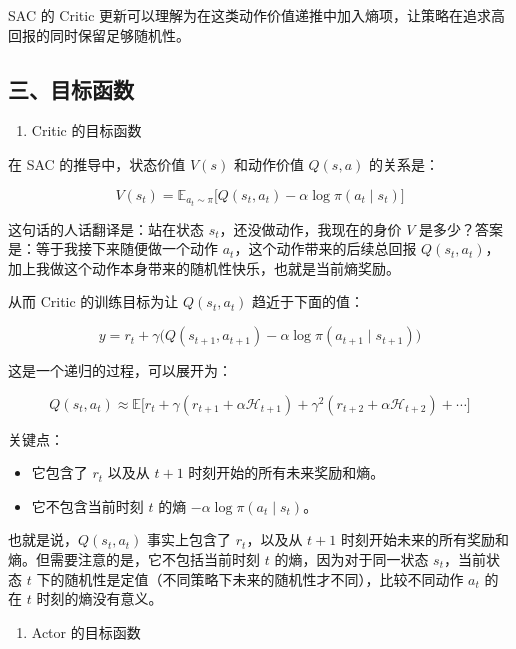 SAC 的 Critic 更新可以理解为在这类动作价值递推中加入熵项，让策略在追求高回报的同时保留足够随机性。

\hypertarget{ux4e09ux76eeux6807ux51fdux6570}{%
\subsection{三、目标函数}\label{ux4e09ux76eeux6807ux51fdux6570}}

\begin{enumerate}
\def\labelenumi{\arabic{enumi}.}
\tightlist
\item
  Critic 的目标函数
\end{enumerate}

在 SAC 的推导中，状态价值 \(V(s)\) 和动作价值 \(Q(s,a)\) 的关系是：

\[
V(s_t)
=
\mathbb{E}_{a_t\sim\pi}
\bigl[
Q(s_t,a_t)
-
\alpha\log\pi(a_t\mid s_t)
\bigr]
\]

这句话的人话翻译是：站在状态 \(s_t\)，还没做动作，我现在的身价 \(V\) 是多少？答案是：等于我接下来随便做一个动作 \(a_t\)，这个动作带来的后续总回报 \(Q(s_t,a_t)\)，加上我做这个动作本身带来的随机性快乐，也就是当前熵奖励。

从而 Critic 的训练目标为让 \(Q(s_t,a_t)\) 趋近于下面的值：

\[
y
=
r_t
+
\gamma
\bigl(
Q(s_{t+1},a_{t+1})
-
\alpha\log\pi(a_{t+1}\mid s_{t+1})
\bigr)
\]

这是一个递归的过程，可以展开为：

\[
Q(s_t,a_t)
\approx
\mathbb{E}
\bigl[
r_t
+
\gamma(r_{t+1}+\alpha\mathcal{H}_{t+1})
+
\gamma^{2}(r_{t+2}+\alpha\mathcal{H}_{t+2})
+
\cdots
\bigr]
\]

关键点：

\begin{itemize}
\tightlist
\item
  它包含了 \(r_t\) 以及从 \(t+1\) 时刻开始的所有未来奖励和熵。
\item
  它不包含当前时刻 \(t\) 的熵 \(-\alpha\log\pi(a_t\mid s_t)\)。
\end{itemize}

也就是说，\(Q(s_t,a_t)\) 事实上包含了 \(r_t\)，以及从 \(t+1\) 时刻开始未来的所有奖励和熵。但需要注意的是，它不包括当前时刻 \(t\) 的熵，因为对于同一状态 \(s_t\)，当前状态 \(t\) 下的随机性是定值（不同策略下未来的随机性才不同），比较不同动作 \(a_t\) 的在 \(t\) 时刻的熵没有意义。

\begin{enumerate}
\def\labelenumi{\arabic{enumi}.}
\setcounter{enumi}{1}
\tightlist
\item
  Actor 的目标函数
\end{enumerate}

